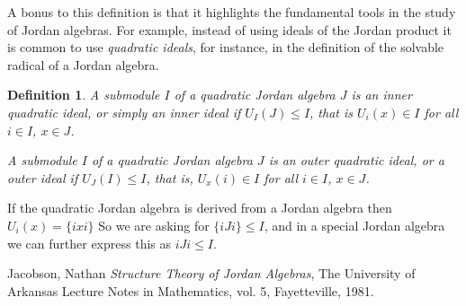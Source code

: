\documentclass[12pt]{article}
\newtheorem{defn}[thm]{Definition}
\begin{document}
A bonus to this definition is that it highlights the fundamental tools in the study of Jordan algebras.  For example, instead of using ideals of the Jordan product it is common to use \emph{quadratic ideals}, for instance, in the definition of the solvable radical of a Jordan algebra.

\begin{defn}
A submodule $I$ of a quadratic Jordan algebra $J$ is an \emph{inner quadratic
ideal}, or simply an \emph{inner ideal} if $U_I(J)\leq I$, that is $U_i(x)\in I$
for all $i\in I$, $x\in J$.

A submodule $I$ of a quadratic Jordan algebra $J$ is an \emph{outer quadratic
ideal}, or a \emph{outer ideal} if $U_J(I)\leq I$, that is, $U_x(i)\in I$
for all $i\in I$, $x\in J$.
\end{defn}

If the quadratic Jordan algebra is derived from a Jordan algebra then
$U_i(x)=\{ixi\}$  So we are asking for $\{iJi\}\leq I$, and in a special
Jordan algebra we can further express this as $iJi\leq I$.

\begin{thebibliography}{8}
Jacobson, Nathan \emph{Structure Theory of Jordan Algebras}, The University of
Arkansas Lecture Notes in Mathematics, vol. 5, Fayetteville, 1981.
\end{thebibliography}

\end{document}
